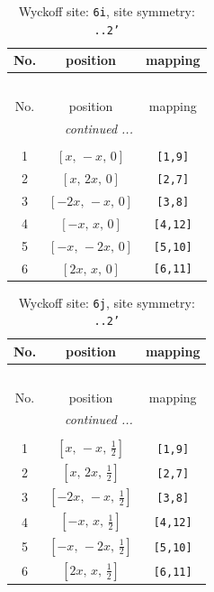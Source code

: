 \documentclass[fleqn,8pt]{jsarticle}
\begin{document}
\renewcommand{\arraystretch}{1.2}
\begin{longtable}{ccc}
\caption{Wyckoff site: {\tt 6i}, site symmetry: {\tt ..2'}}
 \\
 \hline \hline
No. & position & mapping \\ \hline \endfirsthead

\multicolumn{2}{l}{\tablename\ \thetable{}} \\
 \hline \hline
No. & position & mapping \\ \hline \endhead

 \hline \hline
\multicolumn{2}{r}{\footnotesize\it continued ...} \\ \endfoot

 \hline \hline
\multicolumn{2}{r}{} \\ \endlastfoot

1 & $\left[ x,\, - x,\, 0 \right]$ & {\tt [1,9]} \\ \hline
2 & $\left[ x,\, 2 x,\, 0 \right]$ & {\tt [2,7]} \\ \hline
3 & $\left[ - 2 x,\, - x,\, 0 \right]$ & {\tt [3,8]} \\ \hline
4 & $\left[ - x,\, x,\, 0 \right]$ & {\tt [4,12]} \\ \hline
5 & $\left[ - x,\, - 2 x,\, 0 \right]$ & {\tt [5,10]} \\ \hline
6 & $\left[ 2 x,\, x,\, 0 \right]$ & {\tt [6,11]} \\
\end{longtable}
\renewcommand{\arraystretch}{1.2}
\begin{longtable}{ccc}
\caption{Wyckoff site: {\tt 6j}, site symmetry: {\tt ..2'}}
 \\
 \hline \hline
No. & position & mapping \\ \hline \endfirsthead

\multicolumn{2}{l}{\tablename\ \thetable{}} \\
 \hline \hline
No. & position & mapping \\ \hline \endhead

 \hline \hline
\multicolumn{2}{r}{\footnotesize\it continued ...} \\ \endfoot

 \hline \hline
\multicolumn{2}{r}{} \\ \endlastfoot

1 & $\left[ x,\, - x,\, \frac{1}{2} \right]$ & {\tt [1,9]} \\ \hline
2 & $\left[ x,\, 2 x,\, \frac{1}{2} \right]$ & {\tt [2,7]} \\ \hline
3 & $\left[ - 2 x,\, - x,\, \frac{1}{2} \right]$ & {\tt [3,8]} \\ \hline
4 & $\left[ - x,\, x,\, \frac{1}{2} \right]$ & {\tt [4,12]} \\ \hline
5 & $\left[ - x,\, - 2 x,\, \frac{1}{2} \right]$ & {\tt [5,10]} \\ \hline
6 & $\left[ 2 x,\, x,\, \frac{1}{2} \right]$ & {\tt [6,11]} \\
\end{longtable}
\end{document}
